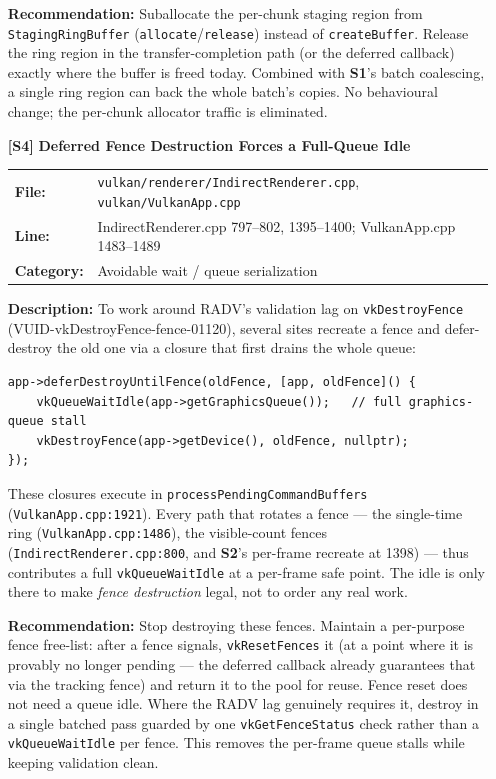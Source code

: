 \documentclass[a4paper,12pt]{article}
\newcommand{\severitybox}[2]{%
  \colorbox{#1}{\makebox[2.5cm][c]{\textcolor{white}{\textbf{#2}}}}%
}
\begin{document}
\begin{enumerate}[leftmargin=*]
  \textbf{Recommendation:}
  Suballocate the per-chunk staging region from \texttt{StagingRingBuffer}
  (\texttt{allocate}/\texttt{release}) instead of \texttt{createBuffer}. Release
  the ring region in the transfer-completion path (or the deferred callback)
  exactly where the buffer is freed today. Combined with \textbf{S1}'s batch
  coalescing, a single ring region can back the whole batch's copies. No
  behavioural change; the per-chunk allocator traffic is eliminated.

\item[\textbf{[S4]}] \textbf{Deferred Fence Destruction Forces a Full-Queue Idle}
  \hfill \severitybox{mediumcolor}{MEDIUM}

  \begin{tabular}{ll}
    \textbf{File:} & \texttt{vulkan/renderer/IndirectRenderer.cpp}, \texttt{vulkan/VulkanApp.cpp} \\
    \textbf{Line:} & IndirectRenderer.cpp 797--802, 1395--1400; VulkanApp.cpp 1483--1489 \\
    \textbf{Category:} & Avoidable wait / queue serialization \\
  \end{tabular}

  \textbf{Description:}
  To work around RADV's validation lag on \texttt{vkDestroyFence}
  (VUID-vkDestroyFence-fence-01120), several sites recreate a fence and
  defer-destroy the old one via a closure that first drains the whole queue:

\begin{lstlisting}
app->deferDestroyUntilFence(oldFence, [app, oldFence]() {
    vkQueueWaitIdle(app->getGraphicsQueue());   // full graphics-queue stall
    vkDestroyFence(app->getDevice(), oldFence, nullptr);
});
\end{lstlisting}

  These closures execute in \texttt{processPendingCommandBuffers}
  (\texttt{VulkanApp.cpp:1921}). Every path that rotates a fence — the
  single-time ring (\texttt{VulkanApp.cpp:1486}), the visible-count fences
  (\texttt{IndirectRenderer.cpp:800}, and \textbf{S2}'s per-frame recreate at
  1398) — thus contributes a full \texttt{vkQueueWaitIdle} at a per-frame safe
  point. The idle is only there to make \emph{fence destruction} legal, not to
  order any real work.

  \textbf{Recommendation:}
  Stop destroying these fences. Maintain a per-purpose fence free-list: after a
  fence signals, \texttt{vkResetFences} it (at a point where it is provably no
  longer pending — the deferred callback already guarantees that via the
  tracking fence) and return it to the pool for reuse. Fence reset does not need
  a queue idle. Where the RADV lag genuinely requires it, destroy in a single
  batched pass guarded by one \texttt{vkGetFenceStatus} check rather than a
  \texttt{vkQueueWaitIdle} per fence. This removes the per-frame queue stalls
  while keeping validation clean.


\end{enumerate}
\end{document}
